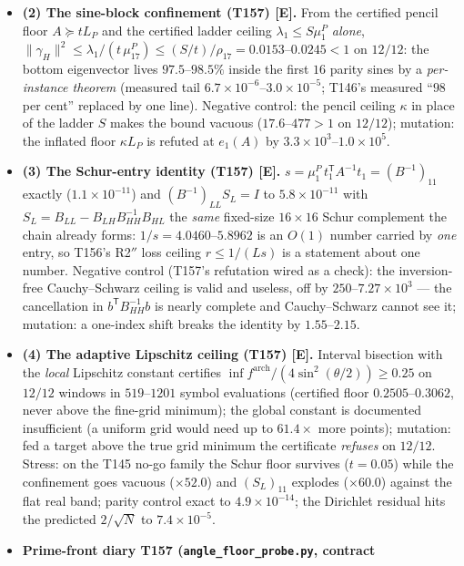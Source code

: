 \documentclass[11pt]{article}
\providecommand{\mE}{\textbf{[E]}}\providecommand{\mC}{\textbf{[C]}}
\begin{document}
\begin{itemize}[leftmargin=1.5em]
instrument reports its own worthlessness; mutation: one corrupted overlap row moves the
certificate by $\ge0.549$, only downward.
\item \textbf{(2) The sine-block confinement (T157) \mE.} From the certified pencil floor
$A\succeq tL_P$ and the certified ladder ceiling $\lambda_1\le S\mu^P_1$ \emph{alone},
$\|\gamma_H\|^2\le\lambda_1/(t\,\mu^P_{17})\le(S/t)/\rho_{17}=0.0153$--$0.0245<1$ on
$12/12$: the bottom eigenvector lives $97.5$--$98.5\%$ inside the first $16$ parity sines
by a \emph{per-instance theorem} (measured tail $6.7\times10^{-6}$--$3.0\times10^{-5}$;
T146's measured ``$98$ per cent'' replaced by one line). Negative control: the pencil
ceiling $\kappa$ in place of the ladder $S$ makes the bound vacuous ($17.6$--$477>1$ on
$12/12$); mutation: the inflated floor $\kappa L_P$ is refuted at $e_1(A)$ by
$3.3\times10^{3}$--$1.0\times10^{5}$.
\item \textbf{(3) The Schur-entry identity (T157) \mE.}
$s=\mu^P_1\,t_1^{\mathsf T}A^{-1}t_1=(B^{-1})_{11}$ exactly ($1.1\times10^{-11}$) and
$(B^{-1})_{LL}S_L=I$ to $5.8\times10^{-11}$ with $S_L=B_{LL}-B_{LH}B_{HH}^{-1}B_{HL}$ the
\emph{same} fixed-size $16\times16$ Schur complement the chain already forms:
$1/s=4.0460$--$5.8962$ is an $O(1)$ number carried by \emph{one} entry, so T156's R2$''$
loss ceiling $r\le1/(Ls)$ is a statement about one number. Negative control (T157's
refutation wired as a check): the inversion-free Cauchy--Schwarz ceiling is valid and
useless, off by $250$--$7.27\times10^{3}$ --- the cancellation in
$b^{\mathsf T}B_{HH}^{-1}b$ is nearly complete and Cauchy--Schwarz cannot see it;
mutation: a one-index shift breaks the identity by $1.55$--$2.15$.
\item \textbf{(4) The adaptive Lipschitz ceiling (T157) \mE.} Interval bisection with the
\emph{local} Lipschitz constant certifies
$\inf f^{\mathrm{arch}}/(4\sin^2(\theta/2))\ge0.25$ on $12/12$ windows in $519$--$1201$
symbol evaluations (certified floor $0.2505$--$0.3062$, never above the fine-grid
minimum); the global constant is documented insufficient (a uniform grid would need up to
$61.4\times$ more points); mutation: fed a target above the true grid minimum the
certificate \emph{refuses} on $12/12$. Stress: on the T145 no-go family the Schur floor
survives ($t=0.05$) while the confinement goes vacuous ($\times52.0$) and $(S_L)_{11}$
explodes ($\times60.0$) against the flat real band; parity control exact to
$4.9\times10^{-14}$; the Dirichlet residual hits the predicted $2/\sqrt N$ to
$7.4\times10^{-5}$.
\item \textbf{Prime-front diary T157 (\texttt{angle\_floor\_probe.py}, contract
}
\end{itemize}
\end{document}
